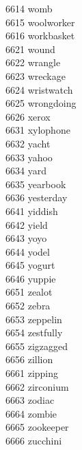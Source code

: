 6614 womb \\
6615 woolworker \\
6616 workbasket \\
6621 wound \\
6622 wrangle \\
6623 wreckage \\
6624 wristwatch \\
6625 wrongdoing \\
6626 xerox \\
6631 xylophone \\
6632 yacht \\
6633 yahoo \\
6634 yard \\
6635 yearbook \\
6636 yesterday \\
6641 yiddish \\
6642 yield \\
6643 yoyo \\
6644 yodel \\
6645 yogurt \\
6646 yuppie \\
6651 zealot \\
6652 zebra \\
6653 zeppelin \\
6654 zestfully \\
6655 zigzagged \\
6656 zillion \\
6661 zipping \\
6662 zirconium \\
6663 zodiac \\
6664 zombie \\
6665 zookeeper \\
6666 zucchini
